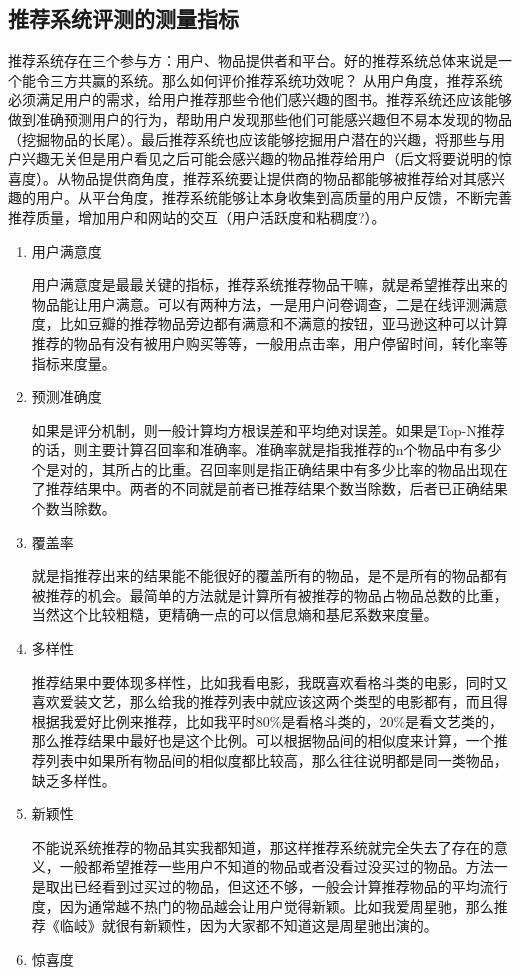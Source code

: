 	\subsection{推荐系统评测的测量指标}
	推荐系统存在三个参与方：用户、物品提供者和平台。好的推荐系统总体来说是一个能令三方共赢的系统。那么如何评价推荐系统功效呢？ 从用户角度，推荐系统必须满足用户的需求，给用户推荐那些令他们感兴趣的图书。推荐系统还应该能够做到准确预测用户的行为，帮助用户发现那些他们可能感兴趣但不易本发现的物品（挖掘物品的长尾）。最后推荐系统也应该能够挖掘用户潜在的兴趣，将那些与用户兴趣无关但是用户看见之后可能会感兴趣的物品推荐给用户（后文将要说明的惊喜度）。从物品提供商角度，推荐系统要让提供商的物品都能够被推荐给对其感兴趣的用户。从平台角度，推荐系统能够让本身收集到高质量的用户反馈，不断完善推荐质量，增加用户和网站的交互（用户活跃度和粘稠度?）。
		\begin{enumerate}[(1)]
		\item 用户满意度

		用户满意度是最最关键的指标，推荐系统推荐物品干嘛，就是希望推荐出来的物品能让用户满意。可以有两种方法，一是用户问卷调查，二是在线评测满意度，比如豆瓣的推荐物品旁边都有满意和不满意的按钮，亚马逊这种可以计算推荐的物品有没有被用户购买等等，一般用点击率，用户停留时间，转化率等指标来度量。
		\item 预测准确度

		如果是评分机制，则一般计算均方根误差和平均绝对误差。如果是Top-N推荐的话，则主要计算召回率和准确率。准确率就是指我推荐的n个物品中有多少个是对的，其所占的比重。召回率则是指正确结果中有多少比率的物品出现在了推荐结果中。两者的不同就是前者已推荐结果个数当除数，后者已正确结果个数当除数。
		\item 覆盖率

		就是指推荐出来的结果能不能很好的覆盖所有的物品，是不是所有的物品都有被推荐的机会。最简单的方法就是计算所有被推荐的物品占物品总数的比重，当然这个比较粗糙，更精确一点的可以信息熵和基尼系数来度量。
		\item 多样性

		推荐结果中要体现多样性，比如我看电影，我既喜欢看格斗类的电影，同时又喜欢爱装文艺，那么给我的推荐列表中就应该这两个类型的电影都有，而且得根据我爱好比例来推荐，比如我平时80\%是看格斗类的，20\%是看文艺类的，那么推荐结果中最好也是这个比例。可以根据物品间的相似度来计算，一个推荐列表中如果所有物品间的相似度都比较高，那么往往说明都是同一类物品，缺乏多样性。
		\item 新颖性

		不能说系统推荐的物品其实我都知道，那这样推荐系统就完全失去了存在的意义，一般都希望推荐一些用户不知道的物品或者没看过没买过的物品。方法一是取出已经看到过买过的物品，但这还不够，一般会计算推荐物品的平均流行度，因为通常越不热门的物品越会让用户觉得新颖。比如我爱周星驰，那么推荐《临岐》就很有新颖性，因为大家都不知道这是周星驰出演的。
		\item 惊喜度


\end{enumerate}
